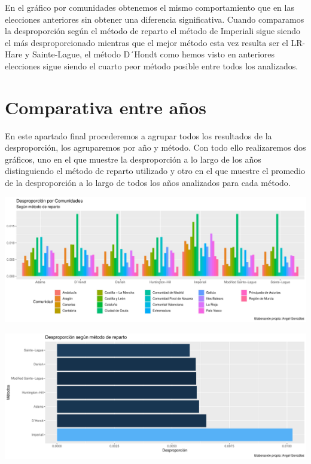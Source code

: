 \documentclass[12pt,a4paper,]{book}
\numberwithin{dummy}{section}
\theoremstyle{ocrenumbox}
\theoremstyle{blacknumex}
\theoremstyle{blacknumbox}
\theoremstyle{ocrenum}
\theoremstyle{ocrenum}
\begin{document}
En el gráfico por comunidades obtenemos el mismo comportamiento que en
las elecciones anteriores sin obtener una diferencia significativa.
Cuando comparamos la desproporción según el método de reparto el método
de Imperiali sigue siendo el más desproporcionado mientras que el mejor
método esta vez resulta ser el LR-Hare y Sainte-Lague, el método D´Hondt
como hemos visto en anteriores elecciones sigue siendo el cuarto peor
método posible entre todos los analizados.

\hypertarget{comparativa-entre-auxf1os}{%
\section{Comparativa entre años}\label{comparativa-entre-auxf1os}}

En este apartado final procederemos a agrupar todos los resultados de la
desproporción, los agruparemos por año y método. Con todo ello
realizaremos dos gráficos, uno en el que muestre la desproporción a lo
largo de los años distinguiendo el método de reparto utilizado y otro en
el que muestre el promedio de la desproporción a lo largo de todos los
años analizados para cada método.

\begin{center}\includegraphics[width=1\linewidth]{figurasR/unnamed-chunk-120-1} \end{center}

\begin{center}\includegraphics[width=1\linewidth]{figurasR/unnamed-chunk-120-2} \end{center}
\end{document}
